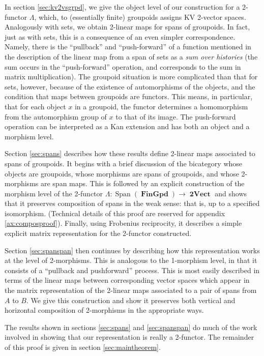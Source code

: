 \documentclass[10pt]{amsart}
\numberwithin{theorem}{subsection}
\newcommand{\opname}[1]{\operatorname{#1}}
\newcommand{\catname}[1]{\boldsymbol{\opname{{#1}}}}
\newcommand{\Span}{\opname{Span}}
\newcommand{\iiV}{\catname{2Vect}}
\newcommand{\Gpd}{\catname{FinGpd}}
\newcommand{\FV}{\Lambda}
\begin{document}
In section \ref{sec:kv2vsgrpd}, we give the object level of our
construction for a 2-functor $\FV$, which, to (essentially finite)
groupoids assigns KV 2-vector spaces.  Analogously with sets, we
obtain 2-linear maps for spans of groupoids.  In fact, just as with
sets, this is a consequence of an even simpler correspondence.
Namely, there is the ``pullback'' and ``push-forward'' of a function
mentioned in the description of the linear map from a span of sets as
a \textit{sum over histories} (the sum occurs in the ``push-forward''
operation, and corresponds to the sum in matrix multiplication).  The
groupoid situation is more complicated than that for sets, however,
because of the existence of automorphisms of the objects, and the
condition that maps between groupoids are functors.  This means, in
particular, that for each object $x$ in a groupoid, the functor
determines a homomorphism from the automorphism group of $x$ to that
of its image.  The push-forward operation can be interpreted as a Kan
extension and has both an object and a morphism level.

Section \ref{sec:spans} describes how these results define 2-linear
maps associated to spans of groupoids.  It begins with a brief
discussion of the bicategory whose objects are groupoids, whose
morphisms are spans of groupoids, and whose 2-morphisms are span maps.
This is followed by an explicit construction of the morphism level of
the 2-functor $\FV : \Span(\Gpd) \rightarrow \iiV$ and shows that it
preserves composition of spans in the weak sense: that is, up to a
specified isomorphism. (Technical details of this proof are reserved
for appendix \ref{ax:composproof}).  Finally, using Frobenius
reciprocity, it describes a simple explicit matrix representation for
the 2-functor constructed.

Section \ref{sec:spanspan} then continues by describing how this
representation works at the level of 2-morphisms.  This is analogous
to the 1-morphism level, in that it consists of a ``pullback and
pushforward'' process.  This is most easily described in terms of the
linear maps between corresponding vector spaces which appear in the
matrix representation of the 2-linear maps associated to a pair of
spans from $A$ to $B$.  We give this construction and show it
preserves both vertical and horizontal composition of 2-morphisms
in the appropriate ways.

The results shown in sections \ref{sec:spans} and \ref{sec:spanspan}
do much of the work involved in showing that our representation is
really a 2-functor.  The remainder of this proof is given in section
\ref{sec:maintheorem}.
\end{document}
